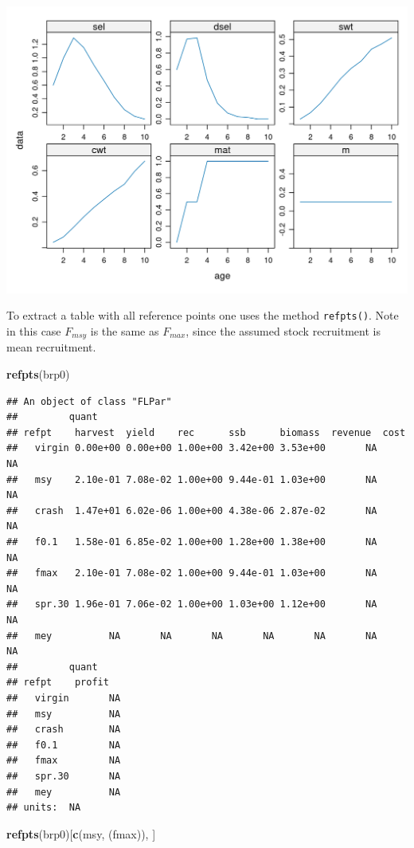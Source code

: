 \documentclass[
]{book}
\newenvironment{Shaded}{\begin{snugshade}}{\end{snugshade}}
\newcommand{\FunctionTok}[1]{\textcolor[rgb]{0.13,0.29,0.53}{\textbf{#1}}}
\newcommand{\NormalTok}[1]{#1}
\newcommand{\StringTok}[1]{\textcolor[rgb]{0.31,0.60,0.02}{#1}}
\begin{document}
\includegraphics{_bookdown_files/_main_files/figure-html/relevant quantities for reference points-1.png}

To extract a table with all reference points one uses the method \texttt{refpts()}. Note in this case \(F_{msy}\) is the same as \(F_{max}\), since the assumed stock recruitment is mean recruitment.

\begin{Shaded}
\begin{Highlighting}[]
\FunctionTok{refpts}\NormalTok{(brp0)}
\end{Highlighting}
\end{Shaded}

\begin{verbatim}
## An object of class "FLPar"
##         quant
## refpt    harvest  yield    rec      ssb      biomass  revenue  cost    
##   virgin 0.00e+00 0.00e+00 1.00e+00 3.42e+00 3.53e+00       NA       NA
##   msy    2.10e-01 7.08e-02 1.00e+00 9.44e-01 1.03e+00       NA       NA
##   crash  1.47e+01 6.02e-06 1.00e+00 4.38e-06 2.87e-02       NA       NA
##   f0.1   1.58e-01 6.85e-02 1.00e+00 1.28e+00 1.38e+00       NA       NA
##   fmax   2.10e-01 7.08e-02 1.00e+00 9.44e-01 1.03e+00       NA       NA
##   spr.30 1.96e-01 7.06e-02 1.00e+00 1.03e+00 1.12e+00       NA       NA
##   mey          NA       NA       NA       NA       NA       NA       NA
##         quant
## refpt    profit  
##   virgin       NA
##   msy          NA
##   crash        NA
##   f0.1         NA
##   fmax         NA
##   spr.30       NA
##   mey          NA
## units:  NA
\end{verbatim}

\begin{Shaded}
\begin{Highlighting}[]
\FunctionTok{refpts}\NormalTok{(brp0)[}\FunctionTok{c}\NormalTok{(}\StringTok{\textquotesingle{}msy\textquotesingle{}}\NormalTok{, (}\StringTok{\textquotesingle{}fmax\textquotesingle{}}\NormalTok{)), ]}
\end{Highlighting}
\end{Shaded}
\end{document}

